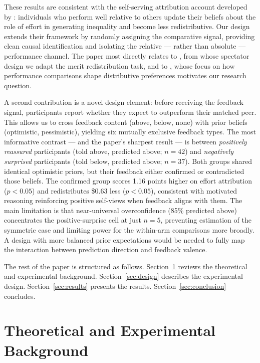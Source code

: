 \documentclass[12pt]{article}
\begin{document}
These results are consistent with the self-serving attribution account
developed by \citet{Deffains2016}: individuals who perform well relative to
others update their beliefs about the role of effort in generating inequality
and become less redistributive.
Our design extends their framework by randomly assigning the comparative
signal, providing clean causal identification and isolating the relative ---
rather than absolute --- performance channel.
The paper most directly relates to \citet{Almas2020}, from whose spectator
design we adapt the merit redistribution task, and to \citet{Cassar2019},
whose focus on how performance comparisons shape distributive preferences
motivates our research question.

A second contribution is a novel design element: before receiving the
feedback signal, participants report whether they expect to outperform
their matched peer.
This allows us to cross feedback content (above, below, none) with prior
beliefs (optimistic, pessimistic), yielding six mutually exclusive
feedback types.
The most informative contrast --- and the paper's sharpest result ---
is between \emph{positively reassured} participants (told above, predicted
above; $n = 42$) and \emph{negatively surprised} participants (told below,
predicted above; $n = 37$).
Both groups shared identical optimistic priors, but their feedback either
confirmed or contradicted those beliefs.
The confirmed group scores 1.16 points higher on effort attribution
($p < 0.05$) and redistributes \$0.63 less ($p < 0.05$),
consistent with motivated reasoning reinforcing positive self-views when
feedback aligns with them.
The main limitation is that near-universal overconfidence (85\% predicted
above) concentrates the positive-surprise cell at just $n = 5$,
preventing estimation of the symmetric case and limiting power for the
within-arm comparisons more broadly.
A design with more balanced prior expectations would be needed to fully
map the interaction between prediction direction and feedback valence.

The rest of the paper is structured as follows.
Section~\ref{sec:lit} reviews the theoretical and experimental background.
Section~\ref{sec:design} describes the experimental design.
Section~\ref{sec:results} presents the results.
Section~\ref{sec:conclusion} concludes.

\section{Theoretical and Experimental Background}
\label{sec:lit}
\end{document}
